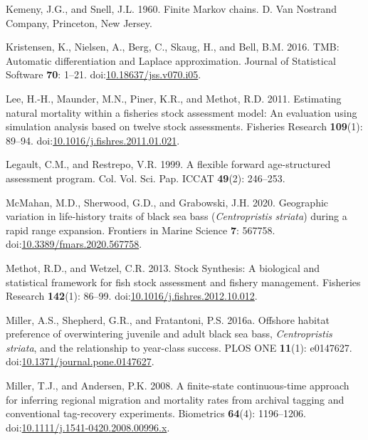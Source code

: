 \documentclass[
]{article}
\newlength{\cslhangindent}
\newlength{\cslentryspacingunit} %
\newenvironment{CSLReferences}[2] %
 {%
  \setlength{\parindent}{0pt}
  \ifodd #1
  \let\oldpar\par
  \def\par{\hangindent=\cslhangindent\oldpar}
  \fi
  \setlength{\parskip}{#2\cslentryspacingunit}
 }%
 {}
\begin{document}
\begin{CSLReferences}{1}{0}
\leavevmode{}%
Kemeny, J.G., and Snell, J.L. 1960. Finite {M}arkov chains. D. Van Nostrand Company, Princeton, New Jersey.

\leavevmode{}%
Kristensen, K., Nielsen, A., Berg, C., Skaug, H., and Bell, B.M. 2016. {TMB}: Automatic differentiation and {Laplace} approximation. Journal of Statistical Software \textbf{70}: 1--21. doi:\href{https://doi.org/10.18637/jss.v070.i05}{10.18637/jss.v070.i05}.

\leavevmode{}%
Lee, H.-H., Maunder, M.N., Piner, K.R., and Methot, R.D. 2011. Estimating natural mortality within a fisheries stock assessment model: An evaluation using simulation analysis based on twelve stock assessments. Fisheries Research \textbf{109}(1): 89--94. doi:\href{https://doi.org/10.1016/j.fishres.2011.01.021}{10.1016/j.fishres.2011.01.021}.

\leavevmode{}%
Legault, C.M., and Restrepo, V.R. 1999. A flexible forward age-structured assessment program. Col. Vol. Sci. Pap. ICCAT \textbf{49}(2): 246--253.

\leavevmode{}%
McMahan, M.D., Sherwood, G.D., and Grabowski, J.H. 2020. Geographic variation in life-history traits of black sea bass (\emph{{C}entropristis striata}) during a rapid range expansion. Frontiers in Marine Science \textbf{7}: 567758. doi:\href{https://doi.org/10.3389/fmars.2020.567758}{10.3389/fmars.2020.567758}.

\leavevmode{}%
Methot, R.D., and Wetzel, C.R. 2013. Stock {S}ynthesis: A biological and statistical framework for fish stock assessment and fishery management. Fisheries Research \textbf{142}(1): 86--99. doi:\href{https://doi.org/10.1016/j.fishres.2012.10.012}{10.1016/j.fishres.2012.10.012}.

\leavevmode{}%
Miller, A.S., Shepherd, G.R., and Fratantoni, P.S. 2016a. Offshore habitat preference of overwintering juvenile and adult black sea bass, \emph{{C}entropristis} \emph{striata}, and the relationship to year-class success. {PLOS} {ONE} \textbf{11}(1): e0147627. doi:\href{https://doi.org/10.1371/journal.pone.0147627}{10.1371/journal.pone.0147627}.

\leavevmode{}%
Miller, T.J., and Andersen, P.K. 2008. A finite-state continuous-time approach for inferring regional migration and mortality rates from archival tagging and conventional tag-recovery experiments. Biometrics \textbf{64}(4): 1196--1206. doi:\href{https://doi.org/10.1111/j.1541-0420.2008.00996.x}{10.1111/j.1541-0420.2008.00996.x}.


\end{CSLReferences}
\end{document}
